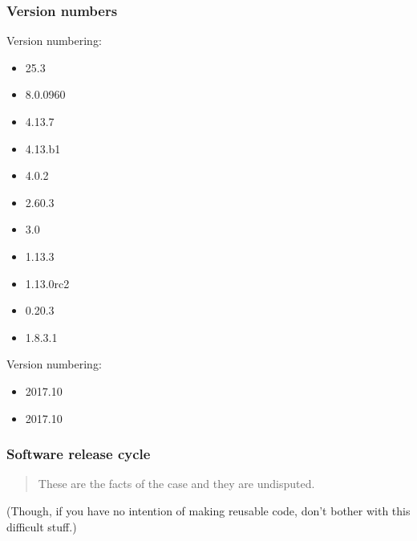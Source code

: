\documentclass{beamer}
\begin{document}
\begin{frame}
  \frametitle{Version numbers}

Version numbering:

\begin{itemize}
\item 25.3
\item 8.0.0960
\item 4.13.7
\item 4.13.b1
\item 4.0.2
\item 2.60.3
\item 3.0
\item 1.13.3
\item 1.13.0rc2
\item 0.20.3
\item 1.8.3.1
\end{itemize}


Version numbering:
\begin{itemize}
\item 2017.10
\item 2017.10
\end{itemize}
\end{frame}


\begin{frame}
  \frametitle{Software release cycle}

  \begin{quote}
    These are the facts of the case and they are undisputed.
  \end{quote}

  (Though, if you have no intention of making reusable code, don't bother with
  this difficult stuff.)
\end{frame}
\end{document}
